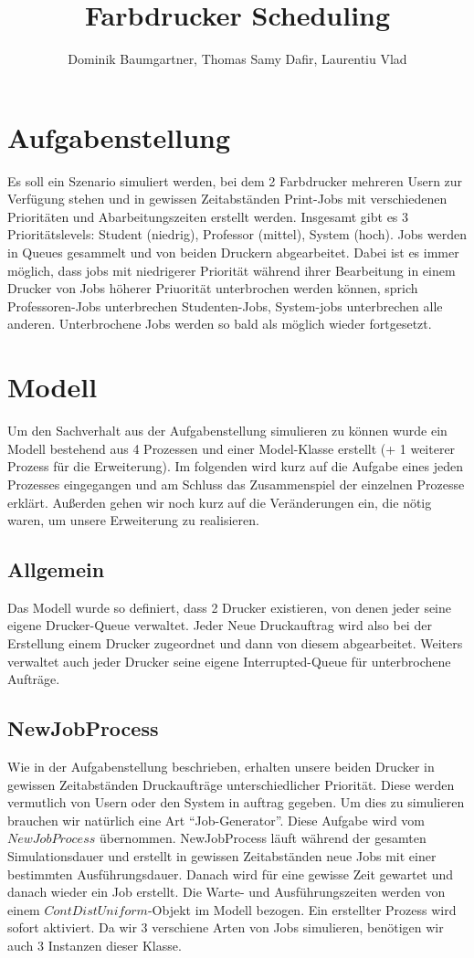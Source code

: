 \documentclass[12pt,a4paper]{article}
\title{Farbdrucker Scheduling}
\author{Dominik Baumgartner, Thomas Samy Dafir, Laurentiu Vlad}
\date{}
\begin{document}
	\maketitle
	
	\section{Aufgabenstellung}
	Es soll ein Szenario simuliert werden, bei dem 2 Farbdrucker mehreren Usern zur Verfügung stehen und in gewissen Zeitabständen Print-Jobs mit
	verschiedenen Prioritäten und Abarbeitungszeiten erstellt werden. Insgesamt gibt es 3 Prioritätslevels: Student (niedrig), Professor (mittel), System (hoch). Jobs 
	werden in Queues gesammelt und von beiden Druckern abgearbeitet. Dabei ist es immer möglich, dass jobs mit niedrigerer Priorität während ihrer Bearbeitung in 
	einem Drucker von Jobs höherer Priuorität unterbrochen werden können, sprich Professoren-Jobs unterbrechen Studenten-Jobs, System-jobs unterbrechen alle 
	anderen. Unterbrochene Jobs werden so bald als möglich wieder fortgesetzt.
	
	\section{Modell}
	Um den Sachverhalt aus der Aufgabenstellung simulieren zu können wurde ein Modell bestehend aus 4 Prozessen und einer Model-Klasse erstellt (+ 1 weiterer Prozess für die Erweiterung).
	Im folgenden wird kurz auf die Aufgabe eines jeden Prozesses eingegangen und am Schluss das Zusammenspiel der einzelnen Prozesse erklärt. Außerden gehen wir noch kurz auf die Veränderungen
	ein, die nötig waren, um unsere Erweiterung zu realisieren.
	
	\subsection{Allgemein}
	Das Modell wurde so definiert, dass 2 Drucker existieren, von denen jeder seine eigene Drucker-Queue verwaltet. Jeder Neue Druckauftrag wird also bei der Erstellung einem Drucker zugeordnet
	und dann von diesem abgearbeitet. Weiters verwaltet auch jeder Drucker seine eigene Interrupted-Queue für unterbrochene Aufträge.
	
	\subsection{NewJobProcess}
	Wie in der Aufgabenstellung beschrieben, erhalten unsere beiden Drucker in gewissen Zeitabständen Druckaufträge unterschiedlicher Priorität. Diese werden vermutlich von Usern oder den System
	in auftrag gegeben. Um dies zu simulieren brauchen wir natürlich eine Art ``Job-Generator''. Diese Aufgabe wird vom $NewJobProcess$ übernommen. NewJobProcess läuft während der gesamten 
	Simulationsdauer und erstellt in gewissen Zeitabständen neue Jobs mit einer bestimmten Ausführungsdauer. Danach wird für eine gewisse Zeit gewartet und danach wieder ein Job erstellt. Die Warte-
	und Ausführungszeiten werden von einem $ContDistUniform$-Objekt im Modell bezogen. Ein erstellter Prozess wird sofort aktiviert. Da wir 3 verschiene Arten von Jobs simulieren, benötigen wir auch
	3 Instanzen dieser Klasse.
	
\end{document}
